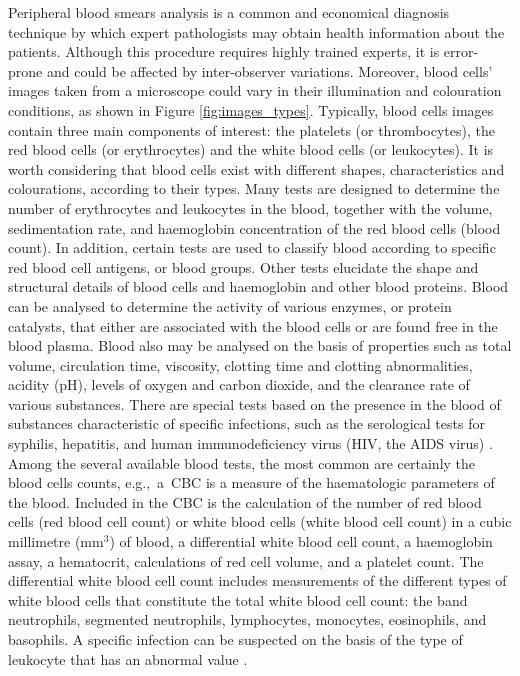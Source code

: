 \documentclass[final,a4paper,12pt,english]{UnicaPhdThesis3}
\begin{document}
Peripheral blood smears analysis is a common and economical diagnosis technique by which expert pathologists may obtain health information about the patients. Although this procedure requires highly trained experts, it is error-prone and could be affected by inter-observer variations. Moreover, blood cells' images taken from a microscope could vary in their illumination and colouration conditions, as shown in Figure \ref{fig:images_types}. Typically, blood cells images contain three main components of interest: the platelets (or thrombocytes), the red blood cells (or erythrocytes) and the white blood cells (or leukocytes). It is worth considering that blood cells exist with different shapes, characteristics and colourations, according to their types.
Many tests are designed to determine the number of erythrocytes and leukocytes in the blood, together with the volume, sedimentation rate, and haemoglobin concentration of the red blood cells (blood count). In addition, certain tests are used to classify blood according to specific red blood cell antigens, or blood groups. Other tests elucidate the shape and structural details of blood cells and haemoglobin and other blood proteins. Blood can be analysed to determine the activity of various enzymes, or protein catalysts, that either are associated with the blood cells or are found free in the blood plasma.
Blood also may be analysed on the basis of properties such as total volume, circulation time, viscosity, clotting time and clotting abnormalities, acidity (pH), levels of oxygen and carbon dioxide, and the clearance rate of various substances. There are special tests based on the presence in the blood of substances characteristic of specific infections, such as the serological tests for syphilis, hepatitis, and human immunodeficiency virus (HIV, the AIDS virus) \cite{Brit}.
Among the several available blood tests, the most common are certainly the blood cells counts, \mbox{e.g., a CBC} is a measure of the haematologic parameters of the blood. Included in the CBC is the calculation of the number of red blood cells (red blood cell count) or white blood cells (white blood cell count) in a cubic millimetre (mm$^{3}$) of blood, a differential white blood cell count, a haemoglobin assay, a hematocrit, calculations of red cell volume, and a platelet count. The differential white blood cell count includes measurements of the different types of white blood cells that constitute the total white blood cell count: the band neutrophils, segmented neutrophils, lymphocytes, monocytes, eosinophils, and basophils. A specific infection can be suspected on the basis of the type of leukocyte that has an abnormal value \cite{DiRuberto2016}.
\end{document}

